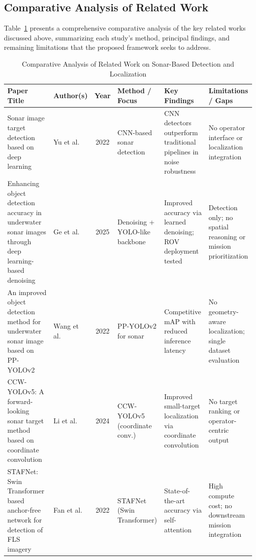 \documentclass[conference]{IEEEtran}
\begin{document}
\subsection{Comparative Analysis of Related Work}

Table~\ref{tab:comparative} presents a comprehensive comparative analysis of the key related works discussed above, summarizing each study's method, principal findings, and remaining limitations that the proposed framework seeks to address.

\begin{table}[!t]
\caption{Comparative Analysis of Related Work on Sonar-Based Detection and Localization}
\label{tab:comparative}
\centering
\footnotesize
\renewcommand{\arraystretch}{1.3}
\begin{tabularx}{\textwidth}{@{} p{3.6cm} l c p{2.4cm} p{3.0cm} p{3.0cm} @{}}
\toprule
\textbf{Paper Title} & \textbf{Author(s)} & \textbf{Year} & \textbf{Method / Focus} & \textbf{Key Findings} & \textbf{Limitations / Gaps} \\
\midrule
Sonar image target detection based on deep learning~\cite{ref7} & Yu et al. & 2022 & CNN-based sonar detection & CNN detectors outperform traditional pipelines in noise robustness & No operator interface or localization integration \\
\addlinespace
Enhancing object detection accuracy in underwater sonar images through deep learning-based denoising~\cite{ref12} & Ge et al. & 2025 & Denoising + YOLO-like backbone & Improved accuracy via learned denoising; ROV deployment tested & Detection only; no spatial reasoning or mission prioritization \\
\addlinespace
An improved object detection method for underwater sonar image based on PP-YOLOv2~\cite{ref14} & Wang et al. & 2022 & PP-YOLOv2 for sonar & Competitive mAP with reduced inference latency & No geometry-aware localization; single dataset evaluation \\
\addlinespace
CCW-YOLOv5: A forward-looking sonar target method based on coordinate convolution~\cite{ref15} & Li et al. & 2024 & CCW-YOLOv5 (coordinate conv.) & Improved small-target localization via coordinate convolution & No target ranking or operator-centric output \\
\addlinespace
STAFNet: Swin Transformer based anchor-free network for detection of FLS imagery~\cite{ref16} & Fan et al. & 2022 & STAFNet (Swin Transformer) & State-of-the-art accuracy via self-attention & High compute cost; no downstream mission integration \\

\end{tabularx}
\end{table}
\end{document}
